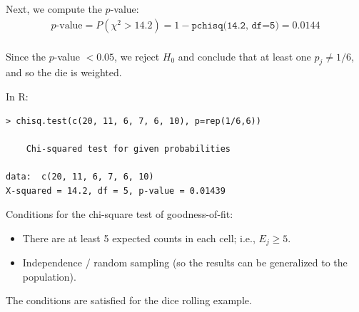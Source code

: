 \documentclass[10pt]{beamer}
\begin{document}
\begin{frame}
Next, we compute the $p$-value:
\begin{align*}
\text{$p$-value} = P(\chi^2 > 14.2) = 1 - \texttt{pchisq(14.2, df=5)} = 0.0144\\ 
\end{align*}

Since the $p$-value $<0.05$, we reject $H_0$ and conclude that at least one $p_j \neq 1/6$, and so the die is weighted.
\end{frame}

\begin{frame}[fragile]
In R:\\

\begin{verbatim}
> chisq.test(c(20, 11, 6, 7, 6, 10), p=rep(1/6,6))

	Chi-squared test for given probabilities

data:  c(20, 11, 6, 7, 6, 10)
X-squared = 14.2, df = 5, p-value = 0.01439
\end{verbatim}

\end{frame}

\begin{frame}
Conditions for the chi-square test of goodness-of-fit:\\
\begin{itemize}
\item There are at least 5 expected counts in each cell; i.e., $E_j \geq 5$.
\item Independence / random sampling (so the results can be generalized to the population).\\
\end{itemize}
\vspace{10pt}

The conditions are satisfied for the dice rolling example. 
\end{frame}

\begin{frame}
\end{frame}
\end{document}
